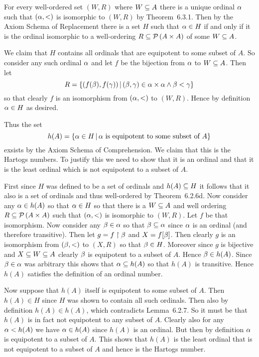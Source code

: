 \begin{questions}

\begin{solution}
	For every well-ordered set $(W,R)$ where $W \ss A$ there is a unique ordinal $\a$ such that $(\a,<)$ is isomorphic to $(W,R)$ by Theorem~6.3.1.
    Then by the Axiom Schema of Replacement there is a set $H$ such that $\a \in H$ if and only if it is the ordinal isomorphic to a well-ordering $R \ss \pset{A \times A}$ of some $W \ss A$.

    We claim that $H$ contains all ordinals that are equipotent to some subset of $A$.
    So consider any such ordinal $\a$ and let $f$ be the bijection from $\a$ to $W \ss A$.
    Then let
    $$
    R = \braces{(f(\b), f(\g)) \where (\b, \g) \in \a \times \a \land \b < \g}
    $$
    so that clearly $f$ is an isomorphism from $(\a, <)$ to $(W, R)$.
    Hence by definition $\a \in H$ as desired.

    Thus the set
    $$
    h(A) = \braces{\a \in H \where \text{$\a$ is equipotent to some subset of $A$}}
    $$
    exsists by the Axiom Schema of Comprehension.
    We claim that this is the Hartogs numbers.
    To justify this we need to show that it is an ordinal and that it is the least ordinal which is not equipotent to a subset of $A$.

    First since $H$ was defined to be a set of ordinals and $h(A) \ss H$ it follows that it also is a set of ordinals and thus well-ordered by Theorem~6.2.6d.
    Now consider any $\a \in h(A)$ so that $\a \in H$ so that there is a $W \ss A$ and well ordering $R \ss \pset{A \times A}$ such that $(\a, <)$ is isomorphic to $(W,R)$.
    Let $f$ be that isomorphism.
    Now consider any $\b \in \a$ so that $\b \ss \a$ since $\a$ is an ordinal (and therefore transitive).
    Then let $g = f \rest \b$ and $X = f[\b]$.
    Then clearly $g$ is an isomorphism from $(\b,<)$ to $(X,R)$ so that $\b \in H$.
    Moreover since $g$ is bijective and $X \ss W \ss A$ clearly $\b$ is equipotent to a subset of $A$.
    Hence $\b \in h(A)$.
    Since $\b \in \a$ was arbitrary this shows that $\a \ss h(A)$ so that $h(A)$ is transitive.
    Hence $h(A)$ satisfies the definition of an ordinal number.

    Now suppose that $h(A)$ itself is equipotent to some subset of $A$.
    Then $h(A) \in H$ since $H$ was shown to contain all such ordinals.
    Then also by definition $h(A) \in h(A)$, which contradicts Lemma~6.2.7.
    So it must be that $h(A)$ is in fact not equipotent to any subset of $A$.
    Clearly also for any $\a < h(A)$ we have $\a \in h(A)$ since $h(A)$ is an ordinal.
    But then by definition $\a$ is equipotent to a subset of $A$.
    This shows that $h(A)$ is the least ordinal that is not equipotent to a subset of $A$ and hence is the Hartogs number. \qedsymbol
\end{solution}


\end{questions}
